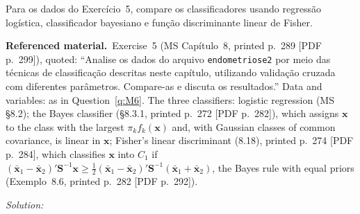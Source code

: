 \documentclass[11pt,a4paper]{article}
\newif\ifsolucoes
\newcommand{\espacoresol}{3.5cm}   %
\numberwithin{equation}{questao}   %
\newenvironment{refmat}{\par\smallskip\noindent\begin{small}\textbf{Referenced material.}\ }{\end{small}\par\smallskip}
\newcommand{\resolespaco}{\ifsolucoes\else\par\textit{Solution:}\vspace{\espacoresol}\par\fi}
\begin{document}
Para os dados do Exercício~5, compare os classificadores usando regressão logística, classificador
bayesiano e função discriminante linear de Fisher.

\begin{refmat}Exercise~5 (MS Capítulo~8, printed p.~289 [PDF p.~299]), quoted: ``Analise os dados do
arquivo \texttt{endometriose2} por meio das técnicas de classificação descritas neste capítulo,
utilizando validação cruzada com diferentes parâmetros. Compare-as e discuta os resultados.'' Data and
variables: as in Question~\ref{q:M6}. The three classifiers: logistic regression (MS §8.2); the Bayes
classifier (§8.3.1, printed p.~272 [PDF p.~282]), which assigns $\mathbf x$ to the class with the
largest $\pi_kf_k(\mathbf x)$ and, with Gaussian classes of common covariance, is linear in $\mathbf x$;
Fisher's linear discriminant (8.18), printed p.~274 [PDF p.~284], which classifies $\mathbf x$ into
$C_1$ if $(\bar{\mathbf x}_1-\bar{\mathbf x}_2)'\mathbf S^{-1}\mathbf x\ge\frac12(\bar{\mathbf x}_1-\bar{\mathbf x}_2)'\mathbf S^{-1}(\bar{\mathbf x}_1+\bar{\mathbf x}_2)$,
the Bayes rule with equal priors (Exemplo~8.6, printed p.~282 [PDF p.~292]).\end{refmat}
\resolespaco
\end{document}

